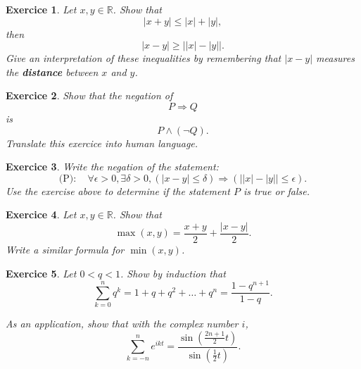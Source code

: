 \documentclass[
	fontsize=10pt, %
	twoside=true, %
	secnumdepth=1, %
	numbers=noenddot, %
]{kaobook}
\newtheorem{exer}{Exercice}[chapter]
\begin{document}
\begin{exer}
Let $x,y\in\mathbb{R}$. Show that
\begin{equation*}
|x+y|\leq |x|+|y|,
\end{equation*}
then
\begin{equation*}
|x-y|\geq \left||x|-|y|\right|.
\end{equation*}
Give an interpretation of these inequalities by remembering that $|x-y|$ measures the \textbf{distance} between $x$ and $y$.
\end{exer}

\begin{exer}
Show that the negation of
\begin{equation*}
P\Rightarrow Q
\end{equation*}
is
\begin{equation*}
P\land(\neg Q).
\end{equation*}
Translate this exercice into human language.
\end{exer}

\begin{exer}
Write the negation of the statement:
\begin{equation*}
\text{(P)}:\quad \forall \epsilon>0, \exists \delta>0, (|x-y|\leq \delta) \Rightarrow (\left||x|-|y|\right|\leq \epsilon).
\end{equation*}
Use the exercise above to determine if the statement $P$ is true or false.
\end{exer}

\begin{exer}
Let $x,y\in\mathbb{R}$. Show that
\begin{equation*}
\max(x,y)=\frac{x+y}{2}+\frac{|x-y|}{2}.
\end{equation*}
Write a similar formula for $\min(x,y)$.
\end{exer}

\begin{exer}
Let $0<q<1$. Show by induction that
\begin{equation*}
\sum\limits_{k=0}^{n}q^k=1+q+q^2+\dots+q^{n}=\frac{1-q^{n+1}}{1-q}.
\end{equation*}

As an application, show that with the complex number $i$,
\begin{equation*}
\sum\limits_{k=-n}^{n}e^{ikt}=\frac{\sin\left(\frac{2n+1}{2}t\right)}{\sin\left(\frac{1}{2}t\right)}.
\end{equation*}
\end{exer}
\end{document}
